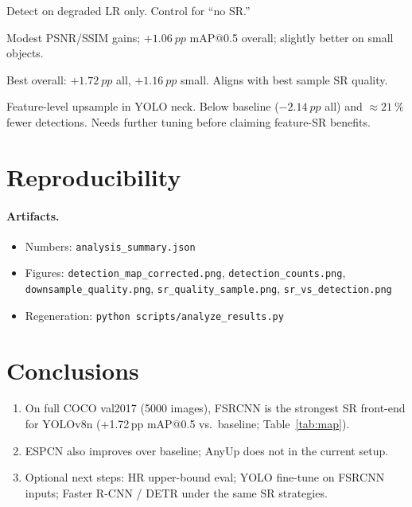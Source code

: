 \documentclass[11pt,a4paper]{article}
\begin{document}
\begin{description}[style=nextline,leftmargin=*]
  \item[Baseline]
        Detect on degraded LR only. Control for ``no SR.''
  \item[ESPCN $2\times$]
        Modest PSNR/SSIM gains; $+\SI{1.06}{pp}$ mAP@0.5 overall;
        slightly better on small objects.
  \item[FSRCNN $2\times$]
        Best overall: $+\SI{1.72}{pp}$ all, $+\SI{1.16}{pp}$ small.
        Aligns with best sample SR quality.
  \item[AnyUp]
        Feature-level upsample in YOLO neck. Below baseline
        ($-\SI{2.14}{pp}$ all) and $\approx\SI{21}{\percent}$ fewer detections.
        Needs further tuning before claiming feature-SR benefits.
\end{description}

\section{Reproducibility}
\label{sec:repro}

\paragraph{Artifacts.}
\begin{itemize}[leftmargin=*]
  \item Numbers: \texttt{analysis\_summary.json}
  \item Figures: \texttt{detection\_map\_corrected.png},
        \texttt{detection\_counts.png}, \texttt{downsample\_quality.png},
        \texttt{sr\_quality\_sample.png}, \texttt{sr\_vs\_detection.png}
  \item Regeneration: \texttt{python scripts/analyze\_results.py}
\end{itemize}

\section{Conclusions}
\label{sec:concl}

\begin{enumerate}[leftmargin=*]
  \item On full COCO val2017 (\num{5000} images), FSRCNN is the strongest
        SR front-end for YOLOv8n (+1.72\,pp mAP@0.5 vs.\ baseline;
        Table~\ref{tab:map}).
  \item ESPCN also improves over baseline; AnyUp does not in the current setup.
  \item Optional next steps: HR upper-bound eval; YOLO fine-tune on
        FSRCNN inputs; Faster R-CNN / DETR under the same SR strategies.
\end{enumerate}
\end{document}
